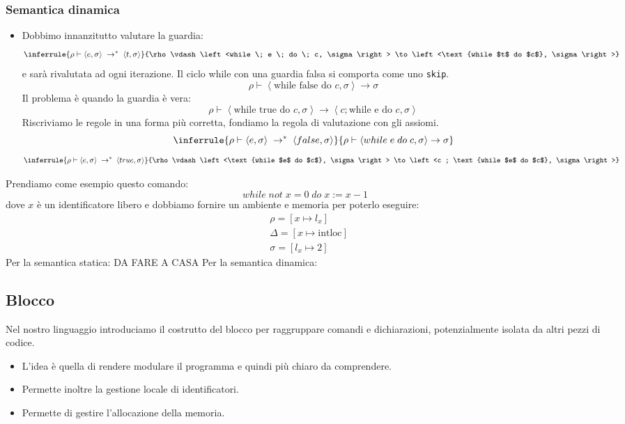 \documentclass[a4paper]{article}
\begin{document}
\subsubsection*{Semantica dinamica}

\begin{itemize}
  \item Dobbimo innanzitutto valutare la guardia:
  \[
    \inferrule
    {\rho \vdash \left<e, \sigma\right> \; \to^*\;  \left<t, \sigma\right>}
    {\rho \vdash \left<while \; e \; do \; c, \sigma\right> \to \left<\text{while $t$ do $c$}, \sigma\right>}
  \]
  e sarà rivalutata ad ogni iterazione.
  Il ciclo while con una guardia falsa si comporta come uno \texttt{skip}.
  \[
    \rho \vdash \left<\text{while false do $c$}, \sigma\right> \to \sigma
  \]
  Il problema è quando la guardia è vera:
  \[
    \rho \vdash \left<\text{while true do $c$}, \sigma\right> \to \left<c ; \text{while e do $c$}, \sigma\right>
  \]
  Riscriviamo le regole in una forma più corretta, fondiamo la regola di valutazione
  con gli assiomi.
  \[
    \inferrule
    {\rho \vdash \left<e, \sigma\right> \; \to^*\;  \left<false, \sigma\right>}
    {\rho \vdash \left<while \; e \; do \; c, \sigma\right> \to \sigma}
  \]
  \[
    \inferrule
    {\rho \vdash \left<e, \sigma\right> \; \to^*\;  \left<true, \sigma\right>}
    {\rho \vdash \left<\text{while $e$ do $c$}, \sigma\right> \to \left<c ; \text{while $e$ do $c$}, \sigma\right>}
  \]
\end{itemize}

\begin{Example}
Prendiamo come esempio questo comando:
\[
  while \; not \; x = 0  \; do \; x := x - 1
\]
dove $x$ è un identificatore libero e dobbiamo fornire un ambiente e memoria per poterlo eseguire:
\[
\begin{aligned}
  &\rho = [x \mapsto l_x] \\
  &\Delta = [x \mapsto \text{intloc}]\\
  &\sigma = [l_x \mapsto 2]
\end{aligned}
\]
Per la semantica statica: DA FARE A CASA 
Per la semantica dinamica:

\end{Example}

\subsection{Blocco}

Nel nostro linguaggio introduciamo il 
costrutto del blocco per raggruppare comandi  
e dichiarazioni, potenzialmente isolata 
da altri pezzi di codice. 
\begin{itemize}
  \item L'idea è quella di rendere modulare il programma 
  e quindi più chiaro da comprendere.
  \item  Permette inoltre la gestione locale di identificatori. 
  \item Permette di gestire l'allocazione della memoria.
\end{itemize}
\end{document}
